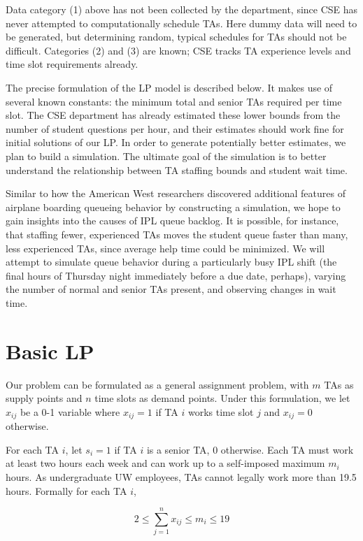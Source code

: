 \documentclass{article}
\begin{document}
\begin{multicols}{2}
Data category (1) above has not been collected by the department, since CSE has never attempted to computationally schedule TAs. Here dummy data will need to be generated, but determining random, typical schedules for TAs should not be difficult. Categories (2) and (3) are known; CSE tracks TA experience levels and time slot requirements already.

The precise formulation of the LP model is described below. It makes use of several known constants: the minimum total and senior TAs required per time slot. The CSE department has already estimated these lower bounds from the number of student questions per hour, and their estimates should work fine for initial solutions of our LP. In order to generate potentially better estimates, we plan to build a simulation. The ultimate goal of the simulation is to better understand the relationship between TA staffing bounds and student wait time.

Similar to how the American West researchers discovered additional features of airplane boarding queueing behavior by constructing a simulation, we hope to gain insights into the causes of IPL queue backlog. It is possible, for instance, that staffing fewer, experienced TAs moves the student queue faster than many, less experienced TAs, since average help time could be minimized. We will attempt to simulate queue behavior during a particularly busy IPL shift (the final hours of Thursday night immediately before a due date, perhaps), varying the number of normal and senior TAs present, and observing changes in wait time.

\section*{Basic LP}
Our problem can be formulated as a general assignment problem, with $m$ TAs as supply points and $n$ time slots as demand points. Under this formulation, we let $x_{ij}$ be a 0-1 variable where $x_{ij} = 1$ if TA $i$ works time slot $j$ and $x_{ij} = 0$ otherwise.

For each TA $i$, let $s_i = 1$ if TA $i$ is a senior TA, 0 otherwise. Each TA must work at least two hours each week and can work up to a self-imposed maximum $m_i$ hours. As undergraduate UW employees, TAs cannot legally work more than 19.5 hours. Formally for each TA $i$,

\begin{equation}
2 \leq \sum_{j=1}^{n}x_{ij} \leq m_i \leq 19
\end{equation}


\end{multicols}
\end{document}
